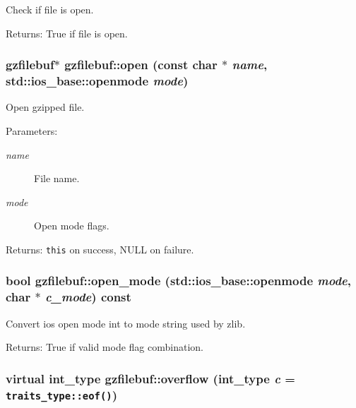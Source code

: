 Check if file is open. 

\begin{Desc}
\item[Returns:]True if file is open. \end{Desc}
\subsubsection{\setlength{\rightskip}{0pt plus 5cm}\bf{gzfilebuf}$\ast$ gzfilebuf::open (const char $\ast$ {\em name}, std::ios\_\-base::openmode {\em mode})}\label{classgzfilebuf_737ac742dfecdcebadbd2ad769412ed1}


Open gzipped file. 

\begin{Desc}
\item[Parameters:]
\begin{description}
\item[{\em name}]File name. \item[{\em mode}]Open mode flags. \end{description}
\end{Desc}
\begin{Desc}
\item[Returns:]{\tt this} on success, NULL on failure. \end{Desc}
\subsubsection{\setlength{\rightskip}{0pt plus 5cm}bool gzfilebuf::open\_\-mode (std::ios\_\-base::openmode {\em mode}, char $\ast$ {\em c\_\-mode}) const\hspace{0.3cm}{\tt  [protected]}}\label{classgzfilebuf_dc7c3f52f432cae36a9dddd217e98e52}


Convert ios open mode int to mode string used by zlib. 

\begin{Desc}
\item[Returns:]True if valid mode flag combination. \end{Desc}
\subsubsection{\setlength{\rightskip}{0pt plus 5cm}virtual int\_\-type gzfilebuf::overflow (int\_\-type {\em c} = {\tt traits\_\-type::eof()})\hspace{0.3cm}{\tt  [protected, virtual]}}\label{classgzfilebuf_aa8efb73e3c98d43b8ae9c33077672ca}


